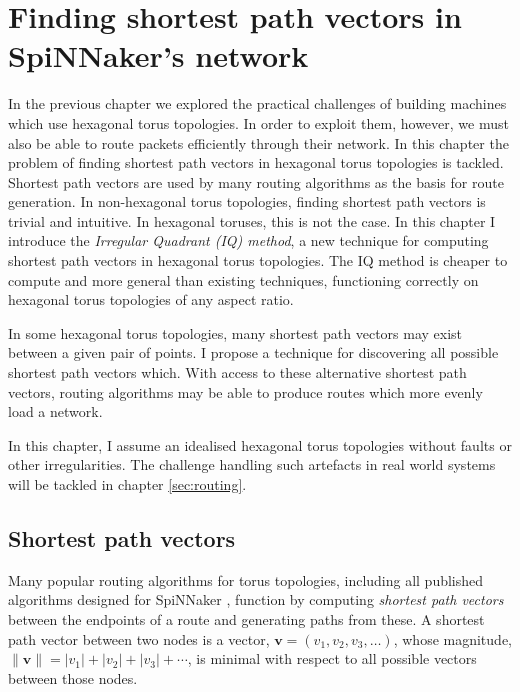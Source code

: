 \chapter{Finding shortest path vectors in SpiNNaker's network}
	
	\label{sec:shortestPaths}
	
	
	In the previous chapter we explored the practical challenges of building
	machines which use hexagonal torus topologies. In order to exploit them,
	however, we must also be able to route packets efficiently through their
	network. In this chapter the problem of finding shortest path vectors in
	hexagonal torus topologies is tackled. Shortest path vectors are used by many
	routing algorithms as the basis for route generation. In non-hexagonal torus
	topologies, finding shortest path vectors is trivial and intuitive. In
	hexagonal toruses, this is not the case. In this chapter I introduce the
	\emph{Irregular Quadrant (IQ) method}, a new technique for computing shortest
	path vectors in hexagonal torus topologies.  The IQ method is cheaper to
	compute and more general than existing techniques, functioning correctly on
	hexagonal torus topologies of any aspect ratio.
	
	In some hexagonal torus topologies, many shortest path vectors may exist
	between a given pair of points. I propose a technique for discovering all
	possible shortest path vectors which. With access to these alternative
	shortest path vectors, routing algorithms may be able to produce routes which
	more evenly load a network.
	
	In this chapter, I assume an idealised hexagonal torus topologies without
	faults or other irregularities. The challenge handling such artefacts in real
	world systems will be tackled in chapter \ref{sec:routing}.
	
	\section{Shortest path vectors}
		
		Many popular routing algorithms for torus topologies, including all
		published algorithms designed for SpiNNaker \cite{davies12,navaridas14},
		function by computing \emph{shortest path vectors} between the endpoints of
		a route and generating paths from these. A shortest path vector between two
		nodes is a vector, $\mathbf{v} = (v_1, v_2, v_3, \ldots)$, whose magnitude,
		$\| \mathbf{v} \| = \lvert v_1 \rvert + \lvert v_2 \rvert + \lvert v_3
		\rvert + \cdots$, is minimal with respect to all possible vectors between
		those nodes.
		
